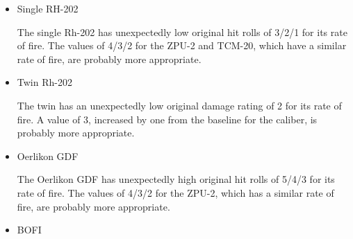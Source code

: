 {\begin{itemize}
            Furthermore, all of these except for the ZU-23 (both \emph{Air Strike} and \emph{The Speed of Heat} versions) have damage ratings increased by one above their baseline values.

            It seems that either there is some reason to reduce the effectiveness of the ZPU-4 and ZU-23 compared to these other guns, or perhaps they have inconsistent values rolls.

            The ZU-23 is undeniably basic, and one might think that would be reason to reduce its effectiveness. However, the TCM-20 is basic too and has both a lower rate of fire than the ZU-23 (1450 compared to 2000) and a smaller caliber (20~mm compared to 23~mm), yet its hit rolls are higher than the ZU-23 in \emph{The Speed of Heat} and its damage rating is the same.

            The best solution would seem to be to give these guns the values we would expect from comparing them to other guns with similar rate of fire and caliber. Therefore, I give both the ZPU-4 and ZU-23 hit rolls of 5/4/3 and the ZU-23 a damage rating of 3.

            (I also considered the idea that increasing the rate of fire increases \emph{either} the hit rolls \emph{or} the damage rating. However, while this might explain the ZPU-4 from \emph{The Speed of Heat} and the twin Rh-202, it does not correctly predict the values of the M167 or Gemag.)

        \item Single RH-202

            The single Rh-202 has unexpectedly low original hit rolls of 3/2/1 for its rate of fire. The values of 4/3/2 for the ZPU-2 and TCM-20, which have a similar rate of fire, are probably more appropriate.

        \item Twin Rh-202

            The twin has an unexpectedly low original damage rating of 2 for its rate of fire. A value of 3, increased by one from the baseline for the caliber, is probably more appropriate.

        \item Oerlikon GDF

            The Oerlikon GDF has unexpectedly high original hit rolls of 5/4/3 for its rate of fire. The values of 4/3/2 for the ZPU-2, which has a similar rate of fire, are probably more appropriate.

        \item BOFI


\end{itemize}}
